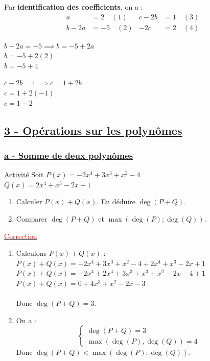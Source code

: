 \documentclass[12pt,a4paper]{article}
\begin{document}
\vspace{0.3cm}
Par \textbf{identification des coefficients}, on a :
\begin{align}
    a &= 2 \quad (1) & c - 2b &= 1 \quad (3) \\
    b - 2a &= -5 \quad (2) & -2c &= 2 \quad (4)
\end{align}

\fbox{\textbf{\textcolor{red}{$a = 2$}}}

\vspace{0.2cm}
$b - 2a = -5 \implies b = -5 + 2a$ \\
$b = -5 + 2(2)$ \\
$b = -5 + 4$ \\
\fbox{\textbf{\textcolor{red}{$b = -1$}}}

\vspace{0.2cm}
$c - 2b = 1 \implies c = 1 + 2b$ \\
$c = 1 + 2(-1)$ \\
$c = 1 - 2$ \\
\fbox{\textbf{\textcolor{red}{$c = -1$}}}

\subsection*{%
    \color{red} \underline{3 - Opérations sur les polynômes}%
}

\subsubsection*{%
    \color{red} \underline{a - Somme de deux polynômes}%
}

\underline{Activité}
Soit $P(x) = -2x^4 + 3x^3 + x^2 - 4$ \\
$Q(x) = 2x^4 + x^3 - 2x + 1$

\begin{enumerate}
    \item Calculer $P(x) + Q(x)$. En déduire $\deg(P+Q)$.
    \item Comparer $\deg(P+Q)$ et $\max(\deg(P); \deg(Q))$.
\end{enumerate}

\underline{\textcolor{red}{Correction}}
\begin{enumerate}
    \item Calculons $P(x) + Q(x)$ : \\
    $P(x) + Q(x) = -2x^4 + 3x^3 + x^2 - 4 + 2x^4 + x^3 - 2x + 1$ \\
    $P(x) + Q(x) = -2x^4 + 2x^4 + 3x^3 + x^3 + x^2 - 2x - 4 + 1$ \\
    $P(x) + Q(x) = 0 + 4x^3 + x^2 - 2x - 3$ \\
     \\
    Donc \textbf{$\deg(P+Q) = 3$}.

    \item On a :
    \[
    \begin{cases}
    \deg(P+Q) = 3 \\
    \max(\deg(P), \deg(Q)) = 4
    \end{cases}
    \]
    Donc \textbf{$\deg(P+Q) < \max(\deg(P); \deg(Q))$}.
\end{enumerate}
\end{document}
